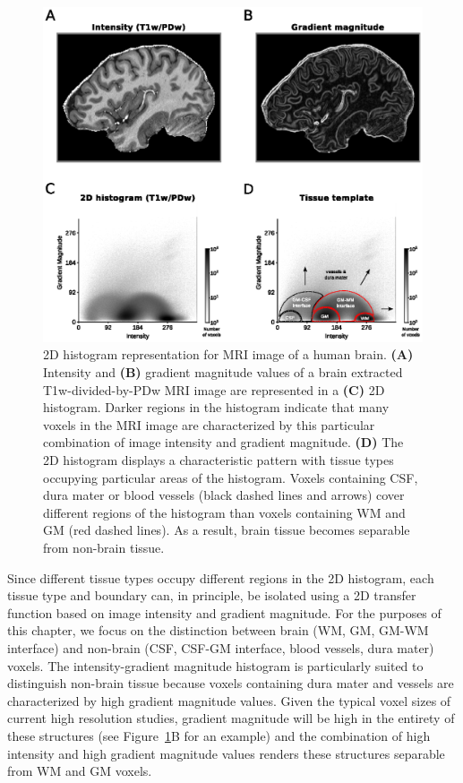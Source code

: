 \begin{figure}[htb!]
\centering
\includegraphics[width=\textwidth]{figures/chapter_02/figure_1.eps}
\caption{2D histogram representation for MRI image of a human brain.
\textbf{(A)} Intensity and \textbf{(B)} gradient magnitude values of a brain extracted T1w-divided-by-PDw MRI image are represented in a \textbf{(C)} 2D histogram. Darker regions in the histogram indicate that many voxels in the MRI image are characterized by this particular combination of image intensity and gradient magnitude. \textbf{(D)} The 2D histogram displays a characteristic pattern with tissue types occupying particular areas of the histogram. Voxels containing CSF, dura mater or blood vessels (black dashed lines and arrows) cover different regions of the histogram than voxels containing WM and GM (red dashed lines). As a result, brain tissue becomes separable from non-brain tissue.}
\label{fig:Fig1}
\end{figure}

Since different tissue types occupy different regions in the 2D histogram, each tissue type and boundary can, in principle, be isolated using a 2D transfer function based on image intensity and gradient magnitude. For the purposes of this chapter, we focus on the distinction between brain (WM, GM, GM-WM interface) and non-brain (CSF, CSF-GM interface, blood vessels, dura mater) voxels. The intensity-gradient magnitude histogram is particularly suited to distinguish non-brain tissue because voxels containing dura mater and vessels are characterized by high gradient magnitude values. Given the typical voxel sizes of current high resolution studies, gradient magnitude will be high in the entirety of these structures (see Figure~\ref{fig:Fig1}B for an example) and the combination of high intensity and high gradient magnitude values renders these structures separable from WM and GM voxels.

